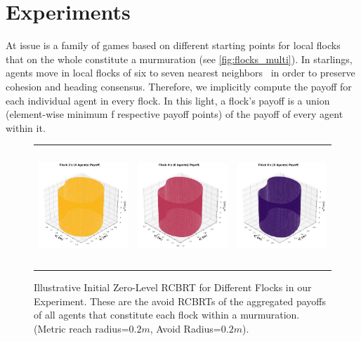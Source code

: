\section{Experiments}
\label{sec:expts}
%
At issue is a family of games based on different starting points for local flocks that on the whole constitute a murmuration (see \autoref{fig:flocks_multi}). 
In starlings, agents move in local flocks of six to seven nearest neighbors~\cite{Ballerini1232} in order to preserve cohesion and heading consensus.  Therefore, we implicitly compute the payoff for each individual agent in every flock. In this light, a flock's payoff is a union (element-wise minimum f respective payoff points) of the payoff of every agent within it. 


%
\begin{figure}[tb!]
	\centering
	\begin{tabular}{ccc} 
		\includegraphics[height=12em,width=10em]{figures/flock_2.jpg} 
		&
		\includegraphics[height=12em,width=10em]{figures/flock_4.jpg} 
		& 
		\includegraphics[height=12em,width=10em]{figures/flock_6.jpg} 
	\end{tabular}
	\caption{\footnotesize Illustrative Initial Zero-Level RCBRT for Different Flocks in our Experiment. These are the avoid RCBRTs of the aggregated payoffs of all  agents that constitute each  flock within a murmuration.  (Metric reach radius=$0.2m$, Avoid Radius=$0.2m$).} 
	\label{fig:flocks_multi}
\end{figure}
